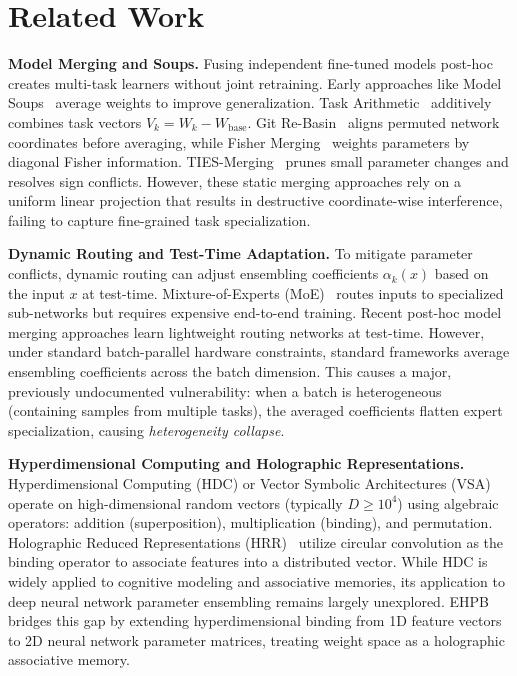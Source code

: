 \section{Related Work}
\label{sec:related}

\textbf{Model Merging and Soups.} Fusing independent fine-tuned models post-hoc creates multi-task learners without joint retraining. Early approaches like Model Soups~\cite{wortsman2022modelsoups} average weights to improve generalization. Task Arithmetic~\cite{ilharco2022editing} additively combines task vectors $V_k = W_k - W_{\text{base}}$. Git Re-Basin~\cite{ainsworth2022git} aligns permuted network coordinates before averaging, while Fisher Merging~\cite{matena2021merging} weights parameters by diagonal Fisher information. TIES-Merging~\cite{yadav2023ties} prunes small parameter changes and resolves sign conflicts. However, these static merging approaches rely on a uniform linear projection that results in destructive coordinate-wise interference, failing to capture fine-grained task specialization.

\textbf{Dynamic Routing and Test-Time Adaptation.} To mitigate parameter conflicts, dynamic routing can adjust ensembling coefficients $\alpha_k(x)$ based on the input $x$ at test-time. Mixture-of-Experts (MoE)~\cite{jacobs1991adaptive, shazeer2017outrageously, fedus2021switch} routes inputs to specialized sub-networks but requires expensive end-to-end training. Recent post-hoc model merging approaches learn lightweight routing networks at test-time. However, under standard batch-parallel hardware constraints, standard frameworks average ensembling coefficients across the batch dimension. This causes a major, previously undocumented vulnerability: when a batch is heterogeneous (containing samples from multiple tasks), the averaged coefficients flatten expert specialization, causing \textit{heterogeneity collapse}.

\textbf{Hyperdimensional Computing and Holographic Representations.} Hyperdimensional Computing (HDC) or Vector Symbolic Architectures (VSA)~\cite{kanerva2009hyperdimensional} operate on high-dimensional random vectors (typically $D \geq 10^4$) using algebraic operators: addition (superposition), multiplication (binding), and permutation. Holographic Reduced Representations (HRR)~\cite{plate2003holographic} utilize circular convolution as the binding operator to associate features into a distributed vector. While HDC is widely applied to cognitive modeling and associative memories, its application to deep neural network parameter ensembling remains largely unexplored. EHPB bridges this gap by extending hyperdimensional binding from 1D feature vectors to 2D neural network parameter matrices, treating weight space as a holographic associative memory.


